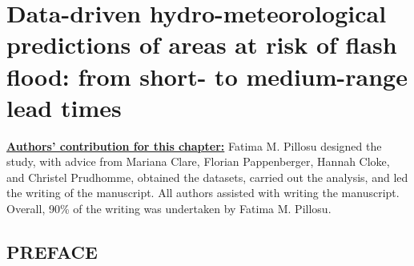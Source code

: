 \ClearShipoutPicture
{}

\chapter{Data-driven hydro-meteorological predictions of areas at risk of flash flood: from short- to medium-range lead times}
\label{data_driven_flash_floods_short_medium_range}
\graphicspath{{chapter_06/figures}{chapter_06/tables}}


\underline{\textbf{Authors' contribution for this chapter:}} Fatima M. Pillosu designed the study, with advice from Mariana Clare, Florian Pappenberger, Hannah Cloke, and Christel Prudhomme, obtained the datasets, carried out the analysis, and led the writing of the manuscript. All authors assisted with writing the manuscript. Overall, 90\% of the writing was undertaken by Fatima M. Pillosu.

\vspace{\baselineskip}

\section*{PREFACE}

